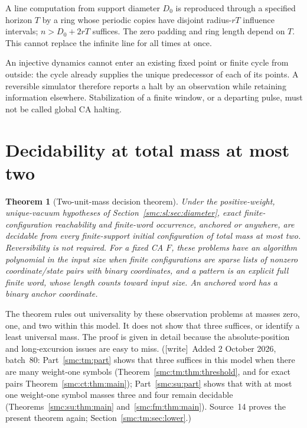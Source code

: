 \documentclass[11pt,letterpaper]{article}
\numberwithin{equation}{section}
\newtheorem{theorem}{Theorem}[section]
\theoremstyle{definition}
\theoremstyle{remark}
\newcommand{\wtag}{\textup{[write]}}
\begin{document}
A line computation from support diameter $D_0$ is reproduced through a specified horizon $T$ by a ring whose periodic copies have disjoint radius-$rT$ influence intervals; $n>D_0+2rT$ suffices. The zero padding and ring length depend on $T$. This cannot replace the infinite line for all times at once.

An injective dynamics cannot enter an existing fixed point or finite cycle from outside: the cycle already supplies the unique predecessor of each of its points. A reversible simulator therefore reports a halt by an observation while retaining information elsewhere. Stabilization of a finite window, or a departing pulse, must not be called global CA halting.

\section{Decidability at total mass at most two}\label{smc:sl:sec:two}
\begin{theorem}[Two-unit-mass decision theorem]\label{smc:sl:thm:two}
Under the positive-weight, unique-vacuum hypotheses of Section~\ref{smc:sl:sec:diameter}, exact finite-configuration reachability and finite-word occurrence, anchored or anywhere, are decidable from every finite-support initial configuration of total mass at most two. Reversibility is not required. For a fixed CA $F$, these problems have an algorithm polynomial in the input size when finite configurations are sparse lists of nonzero coordinate/state pairs with binary coordinates, and a pattern is an explicit full finite word, whose length counts toward input size. An anchored word has a binary anchor coordinate.
\end{theorem}

The theorem rules out universality by these observation problems at masses zero, one, and two within this model. It does not show that three suffices, or identify a least universal mass. The proof is given in detail because the absolute-position and long-excursion issues are easy to miss. (\wtag\ Added 2 October 2026, batch~80: Part~\ref{smc:tm:part} shows that three suffices in this model when there are many weight-one symbols (Theorem~\ref{smc:tm:thm:threshold}, and for exact pairs Theorem~\ref{smc:ct:thm:main}); Part~\ref{smc:su:part} shows that with at most one weight-one symbol masses three and four remain decidable (Theorems~\ref{smc:su:thm:main} and~\ref{smc:fm:thm:main}). Source~14 proves the present theorem again; Section~\ref{smc:tm:sec:lower}.)
\end{document}
